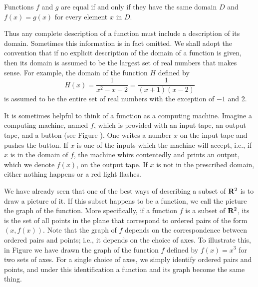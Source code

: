 \begin{prop}
\label{thm 1.2.4}
Functions $f$ and $g$ are equal
if and only if they have the same domain $D$
and $f(x) = g(x)$ for every element $x$ in $D$. 
\end{prop}

Thus any complete description of a function
must include a description of its domain.
Sometimes this information is in fact omitted.
We shall adopt the convention that
if no explicit description of the domain of a function is given,
then its domain is assumed to be the largest set of real numbers
that makes sense.
For example, the domain of the function $H$ defined by
\[
H(x) = \frac{1}{x^2 - x - 2} = \frac{1}{(x + 1)(x - 2)}
\]
is assumed to be the entire set of real numbers
with the exception of $-1$ and 2.

It is sometimes helpful to think of a function
as a computing machine.
Imagine a computing machine,
named $f$,
which is provided with an input tape,
an output tape,
and a button (see Figure ).
One writes a number $x$ on the input tape
and pushes the button.
If $x$ is one of the inputs which the machine will accept,
i.e., if $x$ is in the domain of $f$,
the machine whirs contentedly and prints an output,
which we denote $f(x)$,
on the output tape.
If $x$ is not in the prescribed domain,
either nothing happens or a red light flashes.

We have already seen that
one of the best ways of describing a subset of $\mathrm{\bf R}^2$
is to draw a picture of it.
If this subset happens to be a function,
we call the picture the graph of the function.
More specifically,
if a function $f$ is a subset of $\mathrm{\bf R}^2$,
its  is the set of all points in the plane
that correspond to ordered pairs of the form $(x, f(x))$.
Note that the graph of $f$
depends on the correspondence between ordered pairs and points;
i.e., it depends on the choice of axes.
To illustrate this,
in Figure 
we have drawn the graph of the function $f$
defined by $f(x) = x^3$
for two sets of axes.
For a single choice of axes,
we simply identify ordered pairs and points,
and under this identification
a function and its graph become the same thing.

